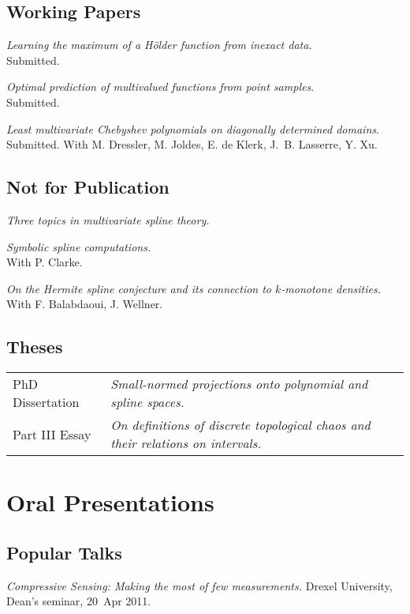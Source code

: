 \documentclass[11pt]{article}
\begin{document}
\subsection{Working Papers}
\betaremune
\item {\sl Learning the maximum of a H\"older function from inexact data}.\\
Submitted.
\item {\sl Optimal prediction of multivalued functions from point samples}.\\
Submitted.
\item {\sl Least multivariate Chebyshev polynomials on diagonally determined domains}.\\
Submitted. With M.  Dressler, M.  Joldes, E. de Klerk, J.~B. Lasserre,  Y. Xu.
\eetaremune

\subsection{Not for Publication}
\betaremune
\item {\sl Three topics in multivariate spline theory.}
\item {\sl Symbolic spline computations.}\\
 With P. Clarke.
\item {\sl On the Hermite spline conjecture and its connection to $k$-monotone densities.}\\
With F. Balabdaoui, J. Wellner.
\eetaremune

\subsection{Theses}
\begin{tabular}{ll}
PhD Dissertation & {\sl Small-normed projections onto polynomial and spline spaces.}\\
Part III Essay & {\sl On definitions of discrete topological chaos and their relations on intervals.}
\end{tabular}


\section{Oral Presentations}

\subsection{Popular Talks}
\betaremune
\item {\sl Compressive Sensing: Making the most of few measurements.}
Drexel University, Dean's seminar, 20~Apr 2011.
\eetaremune
\end{document}
